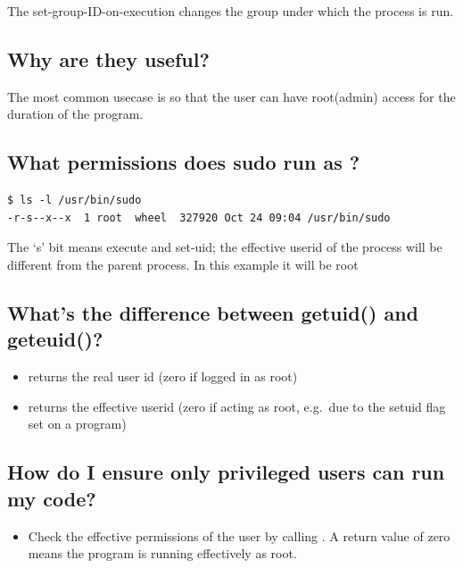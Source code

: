The set-group-ID-on-execution changes the group under which the process is run.

\subsection{Why are they useful?}\label{why-are-they-useful}

The most common usecase is so that the user can have root(admin) access for the duration of the program.

\subsection{What permissions does sudo run as ?}\label{what-permissions-does-sudo-run-as}

\begin{lstlisting}
$ ls -l /usr/bin/sudo
-r-s--x--x  1 root  wheel  327920 Oct 24 09:04 /usr/bin/sudo
\end{lstlisting}

The `s' bit means execute and set-uid; the effective userid of the process will be different from the parent process. In this example it will be root

\subsection{What's the difference between getuid() and geteuid()?}\label{whats-the-difference-between-getuid-and-geteuid}

\begin{itemize}
\tightlist
\item
   returns the real user id (zero if logged in as root)
\item
   returns the effective userid (zero if acting as root, e.g.~due to the setuid flag set on a program)
\end{itemize}

\subsection{How do I ensure only privileged users can run my code?}\label{how-do-i-ensure-only-privileged-users-can-run-my-code}

\begin{itemize}
\tightlist
\item
  Check the effective permissions of the user by calling . A return value of zero means the program is running effectively as root.
\end{itemize}


